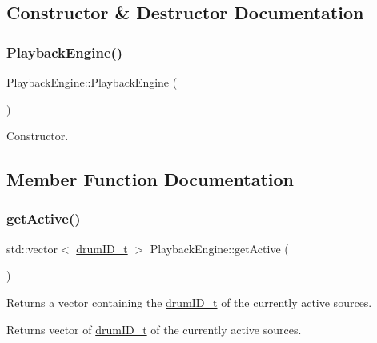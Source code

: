 \subsection{Constructor \& Destructor Documentation}
\mbox{\label{classdrumpi_1_1audio_1_1PlaybackEngine_a19ac34713d360c934c987cac393152d2}} 
\subsubsection{\texorpdfstring{Playback\+Engine()}{PlaybackEngine()}}
{\footnotesize\ttfamily Playback\+Engine\+::\+Playback\+Engine (\begin{DoxyParamCaption}{ }\end{DoxyParamCaption})}

Constructor. 

\subsection{Member Function Documentation}
\mbox{\label{classdrumpi_1_1audio_1_1PlaybackEngine_ac0400bef789e9d731bd8fef84da6f81e}} 
\subsubsection{\texorpdfstring{get\+Active()}{getActive()}}
{\footnotesize\ttfamily std\+::vector$<$ \hyperlink{namespacedrumpi_a3897274035c1b939a604438abe648b1b}{drum\+I\+D\+\_\+t} $>$ Playback\+Engine\+::get\+Active (\begin{DoxyParamCaption}{ }\end{DoxyParamCaption})}

Returns a vector containing the \hyperlink{namespacedrumpi_a3897274035c1b939a604438abe648b1b}{drum\+I\+D\+\_\+t} of the currently active sources. \begin{DoxyReturn}{Returns}
vector of \hyperlink{namespacedrumpi_a3897274035c1b939a604438abe648b1b}{drum\+I\+D\+\_\+t} of the currently active sources. 
\end{DoxyReturn}
\mbox{\label{classdrumpi_1_1audio_1_1PlaybackEngine_a16f4d8c36323b3b580475cd5fc4421c2}} 
